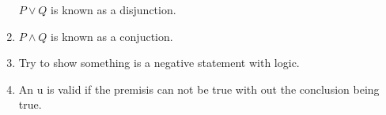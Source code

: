 \documentclass{article}
\begin{document}
	\begin{enumerate}
		\tem  $P \lor Q$ is known as a disjunction.
		\item $P \land Q$ is known as a conjuction.
	  \item Try to show something is a negative statement with logic.
	  \item An u is valid if the premisis can not be true with out the conclusion being true.
	\end{enumerate}
\end{document}
